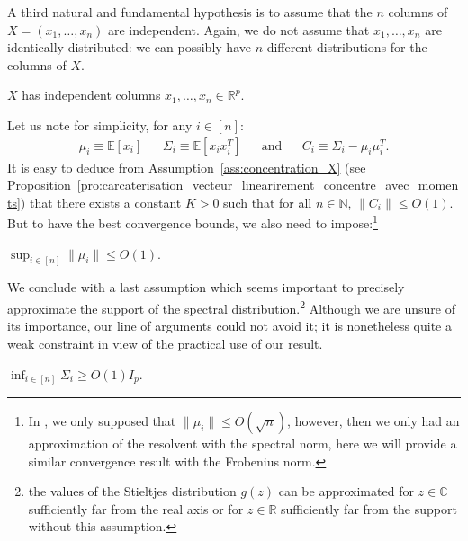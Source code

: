 \documentclass[a4papaer, titlepage]{book}
\begin{document}
A third natural and fundamental hypothesis is to assume that the $n$ columns of $X = (x_1, \ldots, x_n)$ are independent. Again, we do not assume that $x_1, \ldots, x_n$ are identically distributed:
we can possibly have $n$ different distributions for the columns of $X$.
\begin{assumption}\label{ass:x_i_independant}
  $X$ has independent columns $x_1,\ldots, x_n\in \mathbb R^p$.
\end{assumption}
Let us note for simplicity, for any $i \in [n]$:
\begin{align*}
  \mu_i \equiv \mathbb E[x_i]&
  &\Sigma_i \equiv \mathbb E[x_ix_i^T]&
  &\text{and}&
  &C_i \equiv \Sigma_i - \mu_i\mu_i^T.
\end{align*}
It is easy to deduce from Assumption~\ref{ass:concentration_X} (see Proposition~\ref{pro:carcaterisation_vecteur_linearirement_concentre_avec_moments}) that there exists a constant $K>0$ such that for all $n\in \mathbb N$, $  \|C_i\| \leq O(1)$. But to have the best convergence bounds, we also need to impose:\footnote{In \cite{LOU17b}, we only supposed that $\|\mu_i\|\leq O(\sqrt n)$, however, then we only had an approximation of the resolvent with the spectral norm, here we will provide a similar convergence result with the Frobenius norm.}
\begin{assumption}\label{ass:borne_norme_x_i}
  $\sup_{i\in [n]}\|\mu_i\| \leq O(1) $.
\end{assumption}

We conclude with a last assumption which seems important to precisely approximate the support of the spectral distribution.\footnote{the values of the Stieltjes distribution $g(z)$ can be approximated for $z \in \mathbb C$ sufficiently far from the real axis or for $z\in \mathbb R$ sufficiently far from the support without this assumption.} Although we are unsure of its importance, our line of arguments could not avoid it; it is nonetheless quite a weak constraint in view of the practical use of our result.

\begin{assumption}\label{ass:Sigma_borne_inferieurement}
  $\inf_{i \in [n]}\Sigma_i \geq O(1) I_p$.
\end{assumption}


\end{document}
